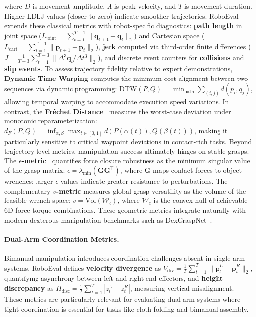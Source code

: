 \documentclass[acmsmall,screen,review,anonymous]{acmart}
\begin{document}
where $D$ is movement amplitude, $A$ is peak velocity, and $T$ is movement duration. Higher LDLJ values (closer to zero) indicate smoother trajectories. RoboEval extends these classical metrics with robot-specific diagnostics: \textbf{path length} in joint space ($L_{\text{joint}} = \sum_{t=1}^{T-1} \|\mathbf{q}_{t+1} - \mathbf{q}_t\|_2$) and Cartesian space ($L_{\text{cart}} = \sum_{t=1}^{T-1} \|\mathbf{p}_{t+1} - \mathbf{p}_t\|_2$), \textbf{jerk} computed via third-order finite differences ($J = \frac{1}{T-3}\sum_{t=1}^{T-3} \|\Delta^3 \mathbf{q}_t / \Delta t^3\|_2$), and discrete event counters for \textbf{collisions} and \textbf{slip events}. To assess trajectory fidelity relative to expert demonstrations, \textbf{Dynamic Time Warping} computes the minimum-cost alignment between two sequences via dynamic programming: $\text{DTW}(P, Q) = \min_{\text{path}} \sum_{(i,j)} d(p_i, q_j)$, allowing temporal warping to accommodate execution speed variations. In contrast, the \textbf{Fr\'{e}chet Distance}~\cite{agarwal2012computingdiscretefrechetdistance} measures the worst-case deviation under monotonic reparameterization: $d_F(P, Q) = \inf_{\alpha,\beta} \max_{t\in[0,1]} d(P(\alpha(t)), Q(\beta(t)))$, making it particularly sensitive to critical waypoint deviations in contact-rich tasks. Beyond trajectory-level metrics, manipulation success ultimately hinges on stable grasps. The \textbf{$\epsilon$-metric}~\cite{ferrari1992grasp} quantifies force closure robustness as the minimum singular value of the grasp matrix: $\epsilon = \lambda_{\min}(\mathbf{G}\mathbf{G}^\top)$, where $\mathbf{G}$ maps contact forces to object wrenches; larger $\epsilon$ values indicate greater resistance to perturbations. The complementary \textbf{$v$-metric} measures global grasp versatility as the volume of the feasible wrench space: $v = \text{Vol}(\mathcal{W}_c)$, where $\mathcal{W}_c$ is the convex hull of achievable 6D force-torque combinations. These geometric metrics integrate naturally with modern dexterous manipulation benchmarks such as DexGraspNet~\cite{wang2023dexgraspnetlargescaleroboticdexterous}.

\paragraph{Dual-Arm Coordination Metrics.}
Bimanual manipulation introduces coordination challenges absent in single-arm systems. RoboEval defines \textbf{velocity divergence} as $V_{\text{div}} = \frac{1}{T}\sum_{t=1}^T \|\dot{\mathbf{p}}_t^L - \dot{\mathbf{p}}_t^R\|_2$, quantifying asynchrony between left and right end-effectors, and \textbf{height discrepancy} as $H_{\text{disc}} = \frac{1}{T}\sum_{t=1}^T |z_t^L - z_t^R|$, measuring vertical misalignment. These metrics are particularly relevant for evaluating dual-arm systems where tight coordination is essential for tasks like cloth folding and bimanual assembly.
\end{document}
